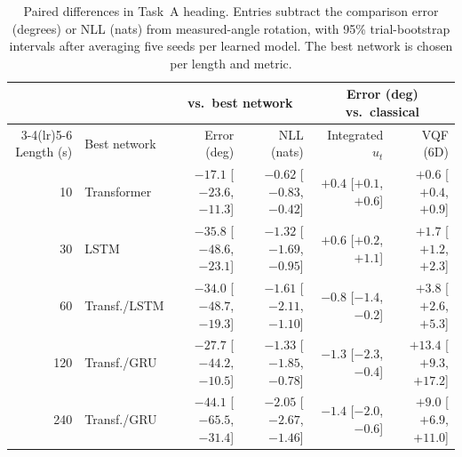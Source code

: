 \begin{table}[H]
\centering\small
\caption{Paired differences in Task~A heading. Entries subtract the
comparison error (degrees) or NLL (nats) from measured-angle rotation,
with 95\% trial-bootstrap intervals after averaging five seeds per
learned model. The best network is chosen per length and metric.}
\label{tab:imu-contrast}
\setlength{\tabcolsep}{4pt}
\begin{tabular}{rlrrrr}
\toprule
& & \multicolumn{2}{c}{vs.\ best network} & \multicolumn{2}{c}{Error (deg) vs.\ classical} \\
\cmidrule(lr){3-4}\cmidrule(lr){5-6}
Length (s) & Best network & Error (deg) & NLL (nats) & Integrated $u_t$ & VQF (6D) \\
\midrule
10 & Transformer & $-17.1$ [$-23.6$, $-11.3$] & $-0.62$ [$-0.83$, $-0.42$] & $+0.4$ [$+0.1$, $+0.6$] & $+0.6$ [$+0.4$, $+0.9$] \\
30 & LSTM & $-35.8$ [$-48.6$, $-23.1$] & $-1.32$ [$-1.69$, $-0.95$] & $+0.6$ [$+0.2$, $+1.1$] & $+1.7$ [$+1.2$, $+2.3$] \\
60 & Transf./LSTM & $-34.0$ [$-48.7$, $-19.3$] & $-1.61$ [$-2.11$, $-1.10$] & $-0.8$ [$-1.4$, $-0.2$] & $+3.8$ [$+2.6$, $+5.3$] \\
120 & Transf./GRU & $-27.7$ [$-44.2$, $-10.5$] & $-1.33$ [$-1.85$, $-0.78$] & $-1.3$ [$-2.3$, $-0.4$] & $+13.4$ [$+9.3$, $+17.2$] \\
240 & Transf./GRU & $-44.1$ [$-65.5$, $-31.4$] & $-2.05$ [$-2.67$, $-1.46$] & $-1.4$ [$-2.0$, $-0.6$] & $+9.0$ [$+6.9$, $+11.0$] \\
\bottomrule
\end{tabular}
\end{table}

